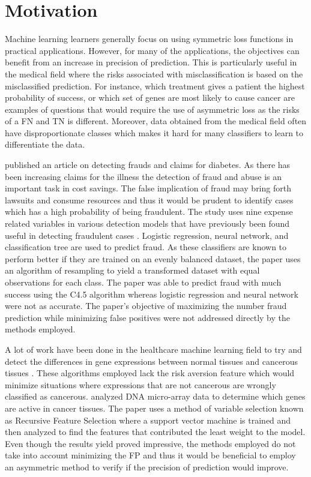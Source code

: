 \documentclass[twoside,11pt]{article}
\begin{document}
\section{Motivation}\label{motivation}
 Machine learning learners generally focus on using symmetric loss functions in practical applications. However, for many of the applications, the objectives can benefit from an increase in precision of prediction. This is particularly useful in the medical field where the risks associated with misclassification is based on the misclassified prediction. For instance, which treatment gives a patient the highest probability of success, or which set of genes are most likely to cause cancer are examples of questions that would require the use of asymmetric loss as the risks of a FN and TN is different. Moreover, data obtained from the medical field often have disproportionate classes which makes it hard for many classifiers to learn to differentiate the data. 

\citet{Liou08} published an article on detecting frauds and claims for diabetes. As there has been increasing claims for the illness the detection of fraud and abuse is an important task in cost savings. The false implication of fraud may bring forth lawsuits and consume resources and thus it would be prudent to identify cases which has a high probability of being fraudulent. The study uses nine expense related variables in various detection models that have previously been found useful in detecting fraudulent cases \citep{Yang06}. Logistic regression, neural network, and classification tree are used to predict fraud. As these classifiers are known to perform better if they are trained on an evenly balanced dataset, the paper uses an algorithm of resampling to yield a transformed dataset with equal observations for each class. The paper was able to predict fraud with much success using the C4.5 algorithm whereas logistic regression and neural network were not as accurate. The paper's objective of maximizing the number fraud prediction while minimizing false positives were not addressed directly by the methods employed. 

A lot of work have been done in the healthcare machine learning field to try and detect the differences in gene expressions between normal tissues and cancerous tissues \citep{Ambroise02}\citep{Guyon02}. These algorithms employed lack the risk aversion feature which would minimize situations where expressions that are not cancerous are wrongly classified as cancerous. \citet{Guyon02} analyzed DNA micro-array data to determine which genes are active in cancer tissues. The paper uses a method of variable selection known as Recursive Feature Selection where a support vector machine is trained and then analyzed to find the features that contributed the least weight to the model. Even though the results yield proved impressive, the methods employed do not take into account minimizing the FP and thus it would be beneficial to employ an asymmetric method to verify if the precision of prediction would improve.
\end{document}
